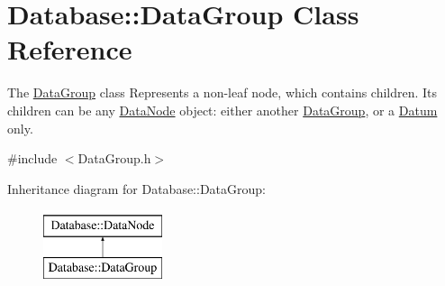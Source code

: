 \hypertarget{classDatabase_1_1DataGroup}{}\section{Database\+:\+:Data\+Group Class Reference}
\label{classDatabase_1_1DataGroup}


The \hyperlink{classDatabase_1_1DataGroup}{Data\+Group} class Represents a non-\/leaf node, which contains children. Its children can be any \hyperlink{classDatabase_1_1DataNode}{Data\+Node} object\+: either another \hyperlink{classDatabase_1_1DataGroup}{Data\+Group}, or a \hyperlink{classDatabase_1_1Datum}{Datum} only.  




{\ttfamily \#include $<$Data\+Group.\+h$>$}

Inheritance diagram for Database\+:\+:Data\+Group\+:\begin{figure}[H]
\begin{center}
\leavevmode
\includegraphics[height=2.000000cm]{classDatabase_1_1DataGroup}
\end{center}
\end{figure}
